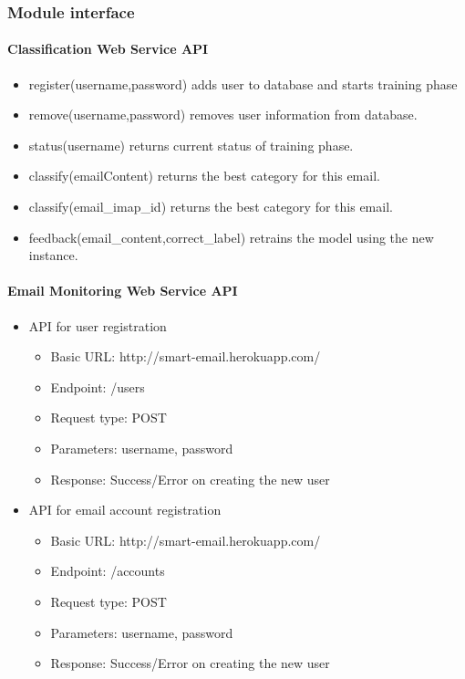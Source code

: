 \subsubsection{Module interface}
\paragraph{Classification Web Service API}
    \begin{itemize} %
      \item register(username,password) adds user to database and starts training phase
      \item remove(username,password) removes user information from database.
      \item status(username) returns current status of training phase.
      \item classify(emailContent) returns the best category for this email.
      \item classify(email\_imap\_id) returns the best category for this email.
      \item feedback(email\_content,correct\_label) retrains the model using the new instance.
    \end{itemize}

\newpage
\paragraph{Email Monitoring Web Service API}
\begin{itemize}
	\item API for user registration
	\begin{itemize}
		\item Basic URL: http://smart-email.herokuapp.com/
		\item Endpoint: /users
		\item Request type: POST
		\item Parameters: username, password
		\item Response: Success/Error on creating the new user
	\end{itemize}

	\item API for email account registration
	\begin{itemize}
		\item Basic URL: http://smart-email.herokuapp.com/
		\item Endpoint: /accounts
		\item Request type: POST
		\item Parameters: username, password
		\item Response: Success/Error on creating the new user
	\end{itemize}
\end{itemize}

